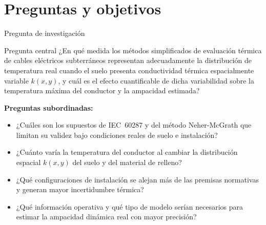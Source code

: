 \documentclass[aspectratio=169]{beamer}
\begin{document}
\section{Preguntas y objetivos}

\begin{frame}{Pregunta de investigación}

\begin{block}{Pregunta central}
\justifying
¿En qué medida los métodos simplificados de evaluación térmica de cables
eléctricos subterráneos representan adecuadamente la distribución de temperatura
real cuando el suelo presenta conductividad térmica espacialmente variable
$k(x,y)$, y cuál es el efecto cuantificable de dicha variabilidad sobre la
temperatura máxima del conductor y la ampacidad estimada?
\end{block}

\vspace{0.6em}
\textbf{Preguntas subordinadas:}
\begin{itemize}[leftmargin=*]\small
  \item ¿Cuáles son los supuestos de IEC~60287 y del método Neher-McGrath que
        limitan su validez bajo condiciones reales de suelo e instalación?
  \item ¿Cuánto varía la temperatura del conductor al cambiar la distribución
        espacial $k(x,y)$ del suelo y del material de relleno?
  \item ¿Qué configuraciones de instalación se alejan más de las premisas normativas
        y generan mayor incertidumbre térmica?
  \item ¿Qué información operativa y qué tipo de modelo serían necesarios para
        estimar la ampacidad dinámica real con mayor precisión?
\end{itemize}
\end{frame}
\end{document}

